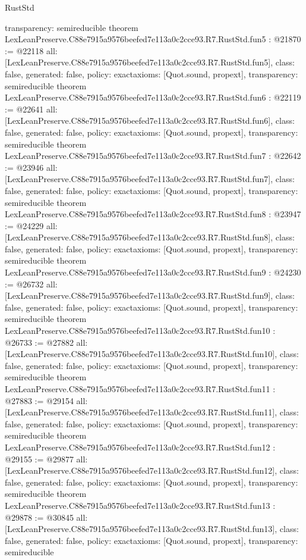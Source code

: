 \begin{lexlean}{RustStd}
\begin{coremodule}
{  transparency: semireducible
}
theorem LexLeanPreserve.C88e7915a9576beefed7e113a0c2cce93.R7.RustStd.fun5 : @21870 := @22118 {
  all: [LexLeanPreserve.C88e7915a9576beefed7e113a0c2cce93.R7.RustStd.fun5],
  class: false,
  generated: false,
  policy: exact{axioms: [Quot.sound, propext]},
  transparency: semireducible
}
theorem LexLeanPreserve.C88e7915a9576beefed7e113a0c2cce93.R7.RustStd.fun6 : @22119 := @22641 {
  all: [LexLeanPreserve.C88e7915a9576beefed7e113a0c2cce93.R7.RustStd.fun6],
  class: false,
  generated: false,
  policy: exact{axioms: [Quot.sound, propext]},
  transparency: semireducible
}
theorem LexLeanPreserve.C88e7915a9576beefed7e113a0c2cce93.R7.RustStd.fun7 : @22642 := @23946 {
  all: [LexLeanPreserve.C88e7915a9576beefed7e113a0c2cce93.R7.RustStd.fun7],
  class: false,
  generated: false,
  policy: exact{axioms: [Quot.sound, propext]},
  transparency: semireducible
}
theorem LexLeanPreserve.C88e7915a9576beefed7e113a0c2cce93.R7.RustStd.fun8 : @23947 := @24229 {
  all: [LexLeanPreserve.C88e7915a9576beefed7e113a0c2cce93.R7.RustStd.fun8],
  class: false,
  generated: false,
  policy: exact{axioms: [Quot.sound, propext]},
  transparency: semireducible
}
theorem LexLeanPreserve.C88e7915a9576beefed7e113a0c2cce93.R7.RustStd.fun9 : @24230 := @26732 {
  all: [LexLeanPreserve.C88e7915a9576beefed7e113a0c2cce93.R7.RustStd.fun9],
  class: false,
  generated: false,
  policy: exact{axioms: [Quot.sound, propext]},
  transparency: semireducible
}
theorem LexLeanPreserve.C88e7915a9576beefed7e113a0c2cce93.R7.RustStd.fun10 : @26733 := @27882 {
  all: [LexLeanPreserve.C88e7915a9576beefed7e113a0c2cce93.R7.RustStd.fun10],
  class: false,
  generated: false,
  policy: exact{axioms: [Quot.sound, propext]},
  transparency: semireducible
}
theorem LexLeanPreserve.C88e7915a9576beefed7e113a0c2cce93.R7.RustStd.fun11 : @27883 := @29154 {
  all: [LexLeanPreserve.C88e7915a9576beefed7e113a0c2cce93.R7.RustStd.fun11],
  class: false,
  generated: false,
  policy: exact{axioms: [Quot.sound, propext]},
  transparency: semireducible
}
theorem LexLeanPreserve.C88e7915a9576beefed7e113a0c2cce93.R7.RustStd.fun12 : @29155 := @29877 {
  all: [LexLeanPreserve.C88e7915a9576beefed7e113a0c2cce93.R7.RustStd.fun12],
  class: false,
  generated: false,
  policy: exact{axioms: [Quot.sound, propext]},
  transparency: semireducible
}
theorem LexLeanPreserve.C88e7915a9576beefed7e113a0c2cce93.R7.RustStd.fun13 : @29878 := @30845 {
  all: [LexLeanPreserve.C88e7915a9576beefed7e113a0c2cce93.R7.RustStd.fun13],
  class: false,
  generated: false,
  policy: exact{axioms: [Quot.sound, propext]},
  transparency: semireducible
}
\end{coremodule}
\end{lexlean}
